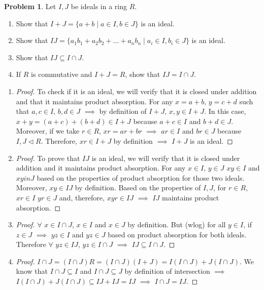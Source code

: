 \documentclass[11pt]{article}
\theoremstyle{definition}
\newtheorem{prob}[thm]{Problem}
\numberwithin{equation}{section}
\begin{document}
\begin{prob}
Let $I, J$ be ideals in a ring $R$. \begin{enumerate}
    \item Show that $I+J = \{a+b \mid a \in I, b \in J\}$ is an ideal.
    \item Show that $IJ = \{a_{1}b_{1}+a_{2}b_{2}+...+a_{n}b_{n} \mid a_{i} \in I, b_{i} \in J\}$ is an ideal.
    \item Show that $IJ \subseteq I \cap J$.
    \item If $R$ is commutative and $I+J = R$, show that $IJ = I \cap J$.
\end{enumerate}
\end{prob}

\begin{enumerate}
\item \begin{proof}To check if it is an ideal, we will verify that it is closed under addition and that it maintains product absorption. For any $x = a+ b$, $y = c + d$ such that $a, c \in I$, $b, d \in J$ $\implies$ by definition of $I+J$, $x, y \in I+J$. In this case, $x+y = (a+c)+(b+d) \in I+J$ because $a+c \in I$ and $b+d \in J$. Moreover, if we take $r \in R$, $xr = ar + br$ $\implies$ $ar \in I$ and $br \in J$ because $I, J \vartriangleleft R$. Therefore, $xr \in I+J$ by definition $\implies$ $I+J$ is an ideal.
\end{proof}

\item \begin{proof} To prove that $IJ$ is an ideal, we will verify that it is closed under addition and it maintains product absorption. For any $x \in I$, $y \in J$ $xy \in I$ and $xy in J$ based on the properties of product absorption for those two ideals. Moreover, $xy \in IJ$ by definition. Based on the properties of $I, J$, for $r \in R$, $xr \in I$ $yr \in J$ and, therefore, $xyr \in IJ$ $\implies$ $IJ$ maintains product absorption.
\end{proof}

\item \begin{proof}$\forall$ $x \in I \cap J$, $x \in I$ and $x \in J$ by definition. But (wlog) for all $y \in I$, if $z \in J$ $\implies$ $yz \in I$ and $yz \in J$ based on product absorption for both ideals. Therefore $\forall$ $yz \in IJ$, $yz \in I \cap J$ $\implies$ $IJ \subseteq I \cap J$.
\end{proof}

\item \begin{proof}$I \cap J = (I \cap J)R = (I \cap J)(I+J) = I(I \cap J) + J(I \cap J)$. We know that $I \cap J \subseteq I$ and $I \cap J \subseteq J$ by definition of intersection $\implies$ $I(I \cap J) + J(I \cap J) \subseteq IJ + IJ = IJ$ $\implies$ $I \cap J = IJ$.
\end{proof}

\end{enumerate}
\end{document}
